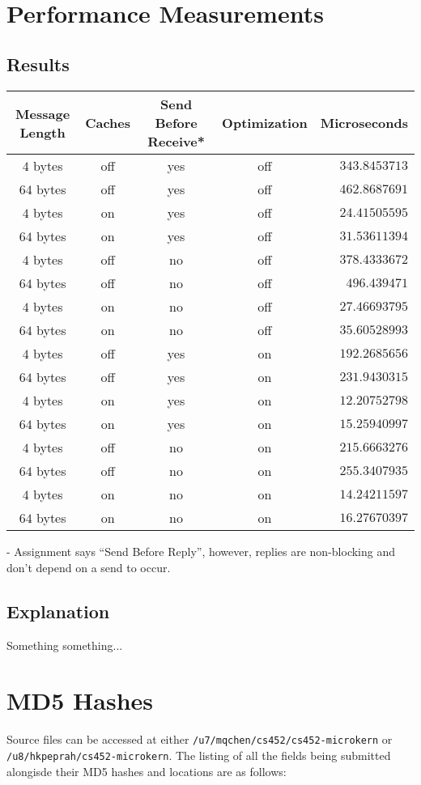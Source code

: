 \documentclass[12pt]{article}
\begin{document}
\\[2\baselineskip]

\section{Performance Measurements}
\subsection{Results}
\begin{tabular}{|c|c|c|c|r|}
  \hline
  {\bf Message Length} & {\bf Caches} & {\bf Send Before Receive*} & {\bf Optimization } & {\bf Microseconds} \\\hline
  $4$ bytes & off & yes & off & $343.8453713$ \\\hline
  $64$ bytes & off & yes & off & $462.8687691$ \\\hline
  $4$ bytes & on & yes & off & $24.41505595$ \\\hline
  $64$ bytes & on & yes & off & $31.53611394$ \\\hline
  $4$ bytes & off & no & off & $378.4333672$ \\\hline
  $64$ bytes & off & no & off & $496.439471$ \\\hline
  $4$ bytes & on & no & off & $27.46693795$ \\\hline
  $64$ bytes & on & no & off & $35.60528993$ \\\hline
  $4$ bytes & off & yes & on & $192.2685656$ \\\hline
  $64$ bytes & off & yes & on & $231.9430315$ \\\hline
  $4$ bytes & on & yes & on & $12.20752798$ \\\hline
  $64$ bytes & on & yes & on & $15.25940997$ \\\hline
  $4$ bytes & off & no & on & $215.6663276$ \\\hline
  $64$ bytes & off & no & on & $255.3407935$ \\\hline
  $4$ bytes & on & no & on & $14.24211597$ \\\hline
  $64$ bytes & on & no & on & $16.27670397$ \\\hline
\end{tabular}
{\tiny {\bf *} - Assignment says ``Send Before Reply'', however, replies are non-blocking and don't depend on a send to occur.}
\\[1\baselineskip]
\subsection{Explanation}
Something something...
\\[2\baselineskip]
\section{MD5 Hashes}
Source files can be accessed at either \texttt{/u7/mqchen/cs452/cs452-microkern} or \\ \texttt{/u8/hkpeprah/cs452-microkern}. The listing of all the fields being submitted alongisde their MD5 hashes and locations are as follows:\\

\end{document}
